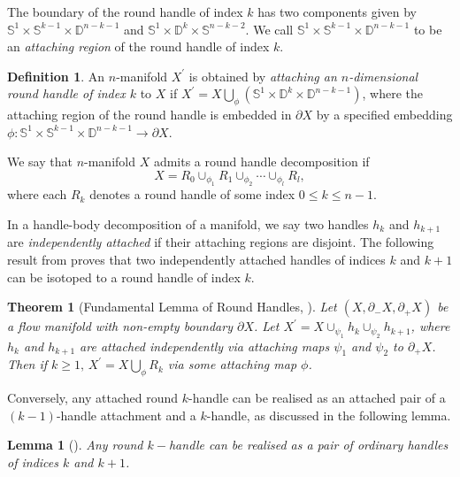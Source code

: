 \documentclass{amsart}
\theoremstyle{plain}
\newtheorem{thm}{Theorem}
\newtheorem{lem}{Lemma}
\theoremstyle{remark}
\theoremstyle{definition}
\newtheorem{defn}{Definition}
\newcommand{\s}{\mathbb{S}}
\newcommand{\D}{\mathbb{D}}
\newcommand{\dd}{\partial}
\begin{document}
The boundary of the round handle of index $k$ has two components given by $\s^1\times \s^{k-1} \times \D^{n-k-1}$ and $\s^1 \times \D^k \times \s^{n-k-2}$. 
We call $\s^1\times \s^{k-1} \times \D^{n-k-1}$ to be an \emph{attaching region} of the round handle of index $k$. 

\begin{defn}
     An $n$-manifold $X^{\prime}$ is obtained by {\it attaching an $n$-dimensional round handle of index $k$} to $X$ if $X^{\prime}= X \bigcup_{\phi}( \s^1 \times \D^k \times \D^{n-k-1})$, where the attaching region of the round handle is embedded in $\partial X$ by a specified embedding $\phi: \s^1 \times \s^{k-1}\times \D^{n-k-1} \to \partial X$. 
\end{defn}

We say that $n$-manifold $X$ admits a round handle decomposition if $$X=  R_0  \cup_{\phi_1} R_1 \cup_{\phi_2} \cdots \cup_{\phi_l} R_l,$$ where each $R_k$ denotes a round handle of some index 
$0\leq k\leq n-1$. %

In a handle-body decomposition of a manifold, we say two handles $h_k$ and $h_{k+1}$ are {\it independently attached} if their attaching regions are disjoint.
The following result from \cite{Asimov} proves that two independently attached handles of indices $k$ and $k+1$ can be isotoped to a round handle of index $k$. 
 
\begin{thm}[Fundamental Lemma of Round Handles, \cite{Asimov}]\label{Thm: FRH}
Let $(X, \dd_{-}X, \dd_{+}X)$ be a flow manifold with non-empty boundary $\partial X$.
Let $X^{\prime} = X \cup_{\psi_1} h_k \cup_{\psi_2} h_{k+1}$, where $h_k$ and $h_{k+1}$ are attached independently via attaching maps $\psi_1$ and $\psi_2$ to $\partial_{+} X$. Then if $k \geq 1, \, X^{\prime} = X \bigcup_{\phi} R_k$ via some attaching map $\phi$.
\end{thm}

Conversely, any attached round $k$-handle can be realised as an attached pair of a $(k-1)$-handle attachment and a $k$-handle, as discussed in the following lemma. 

\begin{lem}[\cite{MFS}]\label{Lem: RHasOH}
    Any round $k-$handle can be realised as a pair of ordinary handles of indices $k$ and $k+1$.  
\end{lem}
 
\end{document}
